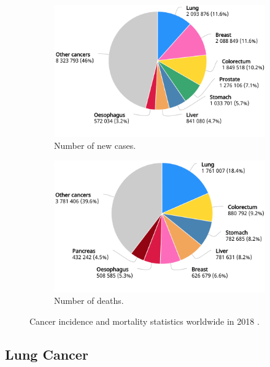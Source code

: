 \begin{figure}[t]
    \centering
    \begin{subfigure}{0.49\textwidth}
        \centering
        \includegraphics[width=\textwidth]{Images/chapter_1/cancer_cases.png}
        \caption{Number of new cases.}
        \label{fig:GCO_1}
    \end{subfigure}
    \hfill
    \begin{subfigure}{0.49\textwidth}
        \centering
        \includegraphics[width=\textwidth]{Images/chapter_1/cancer_deaths.png}
        \caption{Number of deaths.}
        \label{fig:GCO_2}
    \end{subfigure}
    \caption{Cancer incidence and mortality statistics worldwide in 2018 \cite{GCO}.}
    \label{fig:GCO}
\end{figure}

\subsection{Lung Cancer}

